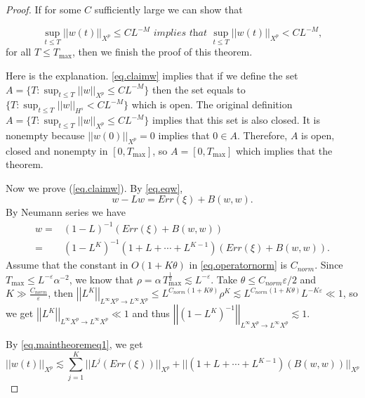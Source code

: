 \begin{proof}
If for some $C$ sufficiently large we can show that

\begin{equation}\label{eq.claimw}
    \sup _{t\le T}||w(t)||_{X^p}\le CL^{-M}\textit{  implies that } \sup _{t\le T}||w(t)||_{X^p}< CL^{-M},
\end{equation}
for all $T\le T_{\text{max}}$, then we finish the proof of this theorem. 

Here is the explanation. \eqref{eq.claimw} implies that if we define the set $A=\{T: \sup _{t\le T}||w||_{X^p}\le CL^{-M}\}$ then the set equals to $\{T: \sup _{t\le T}||w||_{H^s}< CL^{-M}\}$ which is open. The original definition $A=\{T: \sup _{t\le T}||w||_{X^p}\le CL^{-M}\}$ implies that this set is also closed. It is nonempty because $||w(0)||_{X^p}=0$ implies that $0\in A$. Therefore, $A$ is open, closed and nonempty in $[0,T_{\text{max}}]$, so $A=[0,T_{\text{max}}]$ which implies that the theorem.

Now we prove (\ref{eq.claimw}). By \eqref{eq.eqw}, 
\begin{equation}
    w-Lw= Err(\xi)+B(w,w).
\end{equation}
By Neumann series we have
\begin{equation}\label{eq.maintheoremeq1}
    \begin{split}
        w=& (1-L)^{-1}(Err(\xi)+B(w,w))
        \\
        =&(1-L^K)^{-1}(1+L+\cdots+L^{K-1})(Err(\xi)+B(w,w)).
    \end{split}
\end{equation}
Assume that the constant in $O(1+K\theta)$ in \eqref{eq.operatornorm} is $C_{norm}$. Since $T_{\text{max}}\le L^{-\varepsilon} \alpha^{-2}$, we know that $\rho=\alpha\, T^{\frac{1}{2}}_{\text{max}}\lesssim L^{-\varepsilon}$. Take $\theta\le C_{norm}\varepsilon/2$ and $K\gg \frac{C_{norm}}{\varepsilon}$, then $\left|\left|L^K\right|\right|_{L^{\infty}X^p\rightarrow L^{\infty}X^p}\le L^{C_{norm}(1+K\theta)}\rho^K\lesssim L^{C_{norm}(1+K\theta)} L^{-K\varepsilon}\ll 1$, so we get $\left|\left|L^K\right|\right|_{L^{\infty}X^p\rightarrow L^{\infty}X^p}\ll 1$ and thus $\left|\left|(1-L^K)^{-1}\right|\right|_{L^{\infty}X^p\rightarrow L^{\infty}X^p}\lesssim 1$. 

By \eqref{eq.maintheoremeq1}, we get
\begin{equation}
    ||w(t)||_{X^p}\lesssim \sum_{j=1}^K||L^j(Err(\xi))||_{X^p}+ ||(1+L+\cdots+L^{K-1})(B(w,w))||_{X^p}
\end{equation}


\end{proof}

